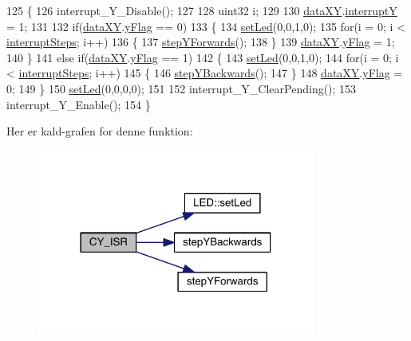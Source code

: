 \begin{DoxyCode}
125 \{
126   interrupt\_Y\_Disable();
127   
128   uint32 i;
129   
130   \hyperlink{data_8h_a89d7998a721b3f36f9f4131e7a5e42d2}{dataXY}.\hyperlink{data_8h_a0149ea97a32442280eb1c0b30c1eeaf1}{interruptY} = 1;
131   
132   \textcolor{keywordflow}{if}(\hyperlink{data_8h_a89d7998a721b3f36f9f4131e7a5e42d2}{dataXY}.\hyperlink{data_8h_a2093b99c34cd9ec2a282b9c4c3f61935}{yFlag} == 0)
133   \{
134     \hyperlink{led_8h_a1d8e725e3829da99c1d027ba0a2ce57a}{setLed}(0,0,1,0);
135     \textcolor{keywordflow}{for}(i = 0; i < \hyperlink{xy_8h_a319d8f8cbb816fc1ca2306587712b0b7}{interruptSteps}; i++)
136     \{
137       \hyperlink{class_x_y_aee60e222d7c603de314c886d5e922a53}{stepYForwards}();
138     \}
139     \hyperlink{data_8h_a89d7998a721b3f36f9f4131e7a5e42d2}{dataXY}.\hyperlink{data_8h_a2093b99c34cd9ec2a282b9c4c3f61935}{yFlag} = 1;
140   \}
141   \textcolor{keywordflow}{else} \textcolor{keywordflow}{if}(\hyperlink{data_8h_a89d7998a721b3f36f9f4131e7a5e42d2}{dataXY}.\hyperlink{data_8h_a2093b99c34cd9ec2a282b9c4c3f61935}{yFlag} == 1)
142   \{
143     \hyperlink{led_8h_a1d8e725e3829da99c1d027ba0a2ce57a}{setLed}(0,0,1,0);
144     \textcolor{keywordflow}{for}(i = 0; i < \hyperlink{xy_8h_a319d8f8cbb816fc1ca2306587712b0b7}{interruptSteps}; i++)
145     \{
146       \hyperlink{class_x_y_aea96dacda1955992c5436dcb829daa26}{stepYBackwards}();
147     \}
148     \hyperlink{data_8h_a89d7998a721b3f36f9f4131e7a5e42d2}{dataXY}.\hyperlink{data_8h_a2093b99c34cd9ec2a282b9c4c3f61935}{yFlag} = 0;
149   \}
150   \hyperlink{led_8h_a1d8e725e3829da99c1d027ba0a2ce57a}{setLed}(0,0,0,0);
151   
152   interrupt\_Y\_ClearPending();
153   interrupt\_Y\_Enable();
154 \}
\end{DoxyCode}


Her er kald-\/grafen for denne funktion\+:\nopagebreak
\begin{figure}[H]
\begin{center}
\leavevmode
\includegraphics[width=259pt]{db/d87/class_x_y_ac83f0a0694002bf5e18e2d5bf499ba7e_cgraph}
\end{center}
\end{figure}


